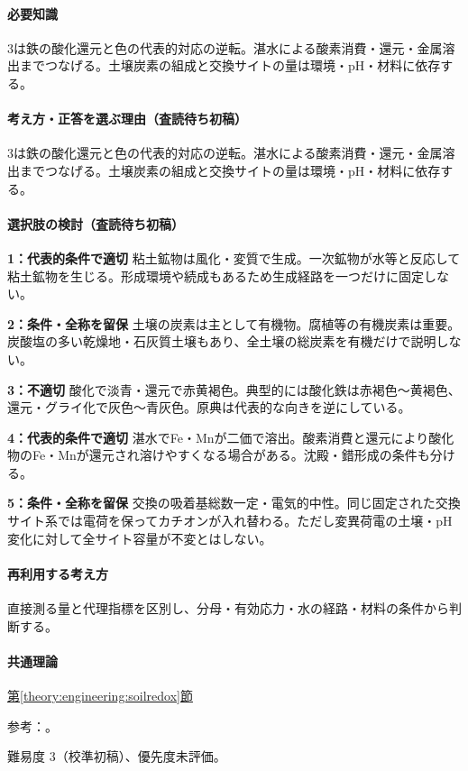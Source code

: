 \paragraph{必要知識} 3は鉄の酸化還元と色の代表的対応の逆転。湛水による酸素消費・還元・金属溶出までつなげる。土壌炭素の組成と交換サイトの量は環境・pH・材料に依存する。

\paragraph{考え方・正答を選ぶ理由（査読待ち初稿）} 3は鉄の酸化還元と色の代表的対応の逆転。湛水による酸素消費・還元・金属溶出までつなげる。土壌炭素の組成と交換サイトの量は環境・pH・材料に依存する。

\paragraph{選択肢の検討（査読待ち初稿）}\mbox{}\par

\noindent\textbf{1：代表的条件で適切} 粘土鉱物は風化・変質で生成。一次鉱物が水等と反応して粘土鉱物を生じる。形成環境や続成もあるため生成経路を一つだけに固定しない。\par

\noindent\textbf{2：条件・全称を留保} 土壌の炭素は主として有機物。腐植等の有機炭素は重要。炭酸塩の多い乾燥地・石灰質土壌もあり、全土壌の総炭素を有機だけで説明しない。\par

\noindent\textbf{3：不適切} 酸化で淡青・還元で赤黄褐色。典型的には酸化鉄は赤褐色〜黄褐色、還元・グライ化で灰色〜青灰色。原典は代表的な向きを逆にしている。\par

\noindent\textbf{4：代表的条件で適切} 湛水でFe・Mnが二価で溶出。酸素消費と還元により酸化物のFe・Mnが還元され溶けやすくなる場合がある。沈殿・錯形成の条件も分ける。\par

\noindent\textbf{5：条件・全称を留保} 交換の吸着基総数一定・電気的中性。同じ固定された交換サイト系では電荷を保ってカチオンが入れ替わる。ただし変異荷電の土壌・pH変化に対して全サイト容量が不変とはしない。\par

\paragraph{再利用する考え方} 直接測る量と代理指標を区別し、分母・有効応力・水の経路・材料の条件から判断する。

\paragraph{共通理論} \hyperref[theory:engineering:soilredox]{第\ref*{theory:engineering:soilredox}節}

\par 参考：\cite{eng52_soil_colour,eng52_weathering}。

\par 難易度 3（校準初稿）、優先度未評価。
